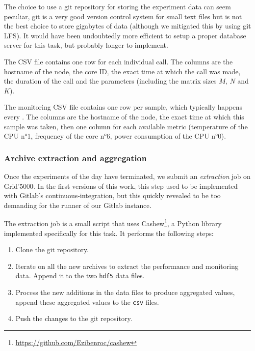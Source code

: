                The choice to use a git repository for storing the experiment data can seem peculiar, git is a very good
                version control system for small text files but is not the best choice to store gigabytes of data
                (although we mitigated this by using git LFS). It would have been undoubtedly more efficient to setup a
                proper database server for this task, but probably longer to implement.

                The \dgemm CSV file contains one row for each individual \dgemm call. The columns are the hostname of
                the node, the core ID, the exact time at which the call was made, the duration of the call and the
                \dgemm parameters (including the matrix sizes \(M\), \(N\) and \(K\)).

                The monitoring CSV file contains one row per sample, which typically happens every . The
                columns are the hostname of the node, the exact time at which this sample was taken, then one column for
                each available metric (\eg temperature of the CPU n°1, frequency of the core n°6, power consumption of
                the CPU n°0).

            \subsubsection{Archive extraction and aggregation}%

                Once the experiments of the day have terminated, we submit an \emph{extraction} job on Grid'5000. In the
                first versions of this work, this step used to be implemented with Gitlab's continuous-integration, but
                this quickly revealed to be too demanding for the runner of our Gitlab instance.

                The extraction job is a small script that uses
                Cashew\footnote{\url{https://github.com/Ezibenroc/cashew}}, a Python library implemented specifically
                for this task. It performs the following steps:
                \begin{enumerate}
                    \item Clone the git repository.
                    \item Iterate on all the new archives to extract the performance and monitoring data. Append it to
                        the two \texttt{hdf5} data files.
                    \item Process the new additions in the data files to produce aggregated values, append these
                        aggregated values to the \texttt{csv} files.
                    \item Push the changes to the git repository.
                \end{enumerate}

